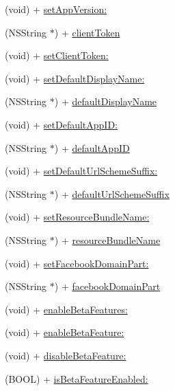 \begin{DoxyCompactItemize}
(void) + \hyperlink{interfaceFBSettings_a01b8ded28d0bc4e050ff6eccb9a03383}{set\+App\+Version\+:}
\item 
(N\+S\+String $\ast$) + \hyperlink{interfaceFBSettings_afa1e8342398ddbdd7e6e9cd0a28094ac}{client\+Token}
\item 
(void) + \hyperlink{interfaceFBSettings_a07cfc161668c190bf5fd37934821c4de}{set\+Client\+Token\+:}
\item 
(void) + \hyperlink{interfaceFBSettings_a783ff4cf8b998eadfbfe2d95efef24a1}{set\+Default\+Display\+Name\+:}
\item 
(N\+S\+String $\ast$) + \hyperlink{interfaceFBSettings_a64b1fe4c26086a1a2bb5b162815f2786}{default\+Display\+Name}
\item 
(void) + \hyperlink{interfaceFBSettings_aae75641f83b1caf710efd2ce72b6eb67}{set\+Default\+App\+I\+D\+:}
\item 
(N\+S\+String $\ast$) + \hyperlink{interfaceFBSettings_af60cce044316df28d128d64e79a77ba5}{default\+App\+ID}
\item 
(void) + \hyperlink{interfaceFBSettings_a08a9504a71c1c9ec329e97da7c636337}{set\+Default\+Url\+Scheme\+Suffix\+:}
\item 
(N\+S\+String $\ast$) + \hyperlink{interfaceFBSettings_ae7709bddfea2d7cf28ad5e91f769dc9b}{default\+Url\+Scheme\+Suffix}
\item 
(void) + \hyperlink{interfaceFBSettings_a60a15470e22d07ad1c7d4a789712e3c1}{set\+Resource\+Bundle\+Name\+:}
\item 
(N\+S\+String $\ast$) + \hyperlink{interfaceFBSettings_ad87ff4e3c9577a22d9a329b12137f976}{resource\+Bundle\+Name}
\item 
(void) + \hyperlink{interfaceFBSettings_a4cfd61825c72f8a5978cb07ba84983d1}{set\+Facebook\+Domain\+Part\+:}
\item 
(N\+S\+String $\ast$) + \hyperlink{interfaceFBSettings_a7ce923f25dd500f81ce518e998bf2f39}{facebook\+Domain\+Part}
\item 
(void) + \hyperlink{interfaceFBSettings_a9ce6bc977fc54c59ba5cacf56922ccac}{enable\+Beta\+Features\+:}
\item 
(void) + \hyperlink{interfaceFBSettings_a390b436e1de87f3d49979a6aa98e14b1}{enable\+Beta\+Feature\+:}
\item 
(void) + \hyperlink{interfaceFBSettings_a6cc67de9d4b0069de4bfc6a3872f7114}{disable\+Beta\+Feature\+:}
\item 
(B\+O\+OL) + \hyperlink{interfaceFBSettings_a16d812cddbf44b8d354393d68757945f}{is\+Beta\+Feature\+Enabled\+:}
\item 

\end{DoxyCompactItemize}
